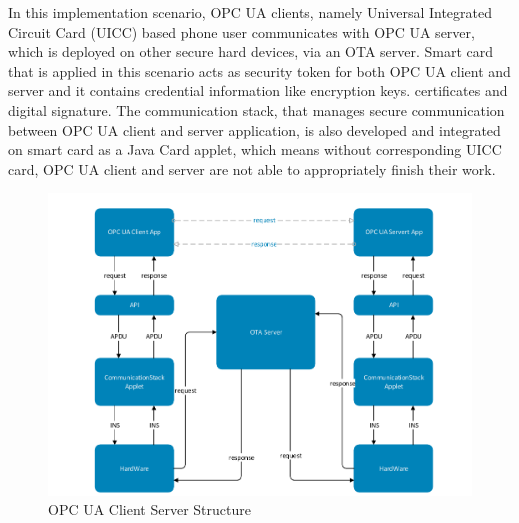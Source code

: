 \documentclass[]{llncs}
\begin{document}
In this implementation scenario, OPC UA clients, namely Universal Integrated Circuit Card (UICC)  based phone user communicates with OPC UA server, which is deployed on other secure hard devices, via an OTA server.   Smart card that is applied in this scenario acts as security token for both OPC UA client and server and it contains credential information like encryption keys. certificates and digital signature. The communication stack, that manages secure  communication between OPC UA client and server application, is also developed and integrated on smart card as a Java Card applet, which means without corresponding UICC card, OPC UA client and server are not able to appropriately finish their work.
 \begin{figure}[ht]

	\centering
	\includegraphics[width=1.1\textwidth]{csoverview}
		\caption[ ]{OPC UA Client Server Structure}
	\label{fig:softwareStructure}
\end{figure}
\end{document}
